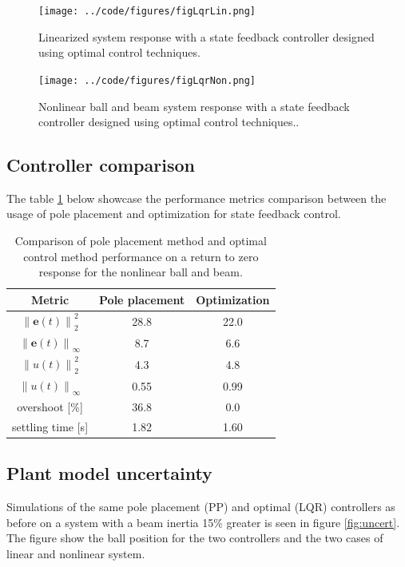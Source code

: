 \documentclass[a4paper, titlepage]{article}
\begin{document}
\begin{figure}[H]
\center
\texttt{[image: ../code/figures/figLqrLin.png]}
\caption{Linearized system response with a state feedback controller designed using optimal control techniques.}
\label{fig:lqrLin}
\end{figure}

\begin{figure}[H]
\center
\texttt{[image: ../code/figures/figLqrNon.png]}
\caption{Nonlinear ball and beam system response with a state feedback controller designed using optimal control techniques..}
\label{fig:lqrNon}
\end{figure}

\subsection{Controller comparison}
The table \ref{tab:compare} below showcase the performance metrics comparison between the usage of pole placement and optimization for state feedback control.

\begin{table}[h!]
\centering
 \begin{tabular}{||c c c||} 
 \hline
 Metric & Pole placement & Optimization \\ [0.5ex] 
 \hline\hline
 $\left\lVert \textbf{e}(t)\right\rVert_2^2$ & 28.8 & 22.0 \\ 
 $\left\lVert \textbf{e}(t)\right\rVert_\infty$ & 8.7 & 6.6 \\
 $\left\lVert u(t)\right\rVert_2^2$ & 4.3 & 4.8 \\
 $\left\lVert u(t)\right\rVert_\infty$ & 0.55 & 0.99 \\
 overshoot [\%] & 36.8 & 0.0 \\
 settling time [s] & 1.82 & 1.60 \\ [1ex] 
 \hline
 \end{tabular}
 \caption{Comparison of pole placement method and optimal control method performance on a return to zero response for the nonlinear ball and beam.}
 \label{tab:compare}
\end{table}

\subsection{Plant model uncertainty}
Simulations of the same pole placement (PP) and optimal (LQR) controllers as before on a system with a beam inertia 15\% greater is seen in figure \ref{fig:uncert}. 
The figure show the ball position for the two controllers and the two cases of linear and nonlinear system.
\end{document}
